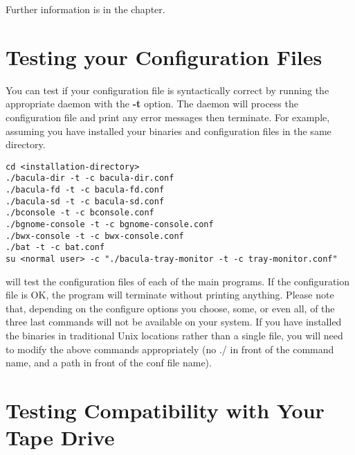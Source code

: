 Further information is in the
 chapter.

\section{Testing your Configuration Files}

You can test if your configuration file is syntactically correct by running
the appropriate daemon with the {\bf -t} option. The daemon will process the
configuration file and print any error messages then terminate. For example,
assuming you have installed your binaries and configuration files in the same
directory. 

\footnotesize
\begin{verbatim}
cd <installation-directory>
./bacula-dir -t -c bacula-dir.conf
./bacula-fd -t -c bacula-fd.conf
./bacula-sd -t -c bacula-sd.conf
./bconsole -t -c bconsole.conf
./bgnome-console -t -c bgnome-console.conf
./bwx-console -t -c bwx-console.conf
./bat -t -c bat.conf
su <normal user> -c "./bacula-tray-monitor -t -c tray-monitor.conf"
\end{verbatim}
\normalsize

will test the configuration files of each of the main programs. If the
configuration file is OK, the program will terminate without printing
anything. Please note that, depending on the configure options you choose,
some, or even all, of the three last commands will not be available on your
system. If you have installed the binaries in traditional Unix locations
rather than a single file, you will need to modify the above commands
appropriately (no ./ in front of the command name, and a path in front of the
conf file name). 
\label{TapeTesting}

\section{Testing Compatibility with Your Tape Drive}

